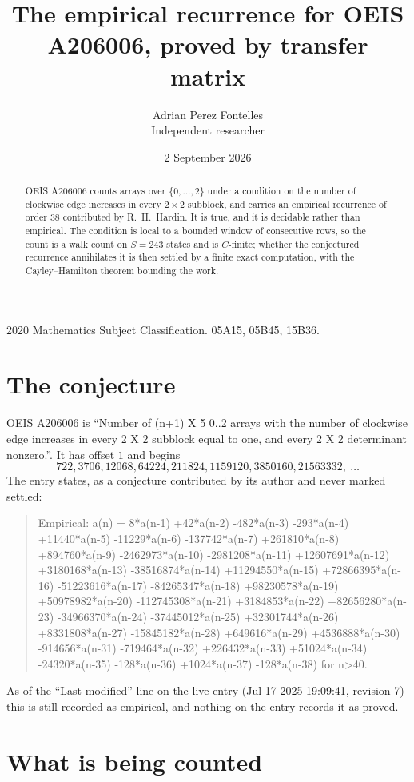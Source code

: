 \documentclass[11pt,a4paper]{article}
\title{The empirical recurrence for OEIS A206006, proved by transfer matrix}
\author{Adrian Perez Fontelles\\ \small Independent researcher}
\date{2 September 2026}
\theoremstyle{plain}
\theoremstyle{definition}
\begin{document}
\maketitle

\begin{abstract}
OEIS A206006 counts arrays over $\{0,\dots,2\}$ under a condition on the number of clockwise edge increases
in every $2\times2$ subblock, and carries an empirical recurrence of order $38$ contributed by
R.~H.~Hardin. It is true, and it is decidable rather than empirical. The condition is local to
a bounded window of consecutive rows, so the count is a walk count on $S=243$ states and is
$C$-finite; whether the conjectured recurrence annihilates it is then settled by a finite exact
computation, with the Cayley--Hamilton theorem bounding the work.
\end{abstract}

\noindent\small 2020 Mathematics Subject Classification. 05A15, 05B45, 15B36.\normalsize

\section{The conjecture}

OEIS A206006 is ``Number of (n+1) X 5 0..2 arrays with the number of clockwise edge increases in every 2 X 2 subblock equal to one, and every 2 X 2 determinant nonzero.''. It has offset $1$ and begins
\[
722, 3706, 12068, 64224, 211824, 1159120, 3850160, 21563332,\ \dots
\]
The entry states, as a conjecture contributed by its author and never marked settled:
\begin{quote}
Empirical: a(n) = 8*a(n-1) +42*a(n-2) -482*a(n-3) -293*a(n-4) +11440*a(n-5) -11229*a(n-6) -137742*a(n-7) +261810*a(n-8) +894760*a(n-9) -2462973*a(n-10) -2981208*a(n-11) +12607691*a(n-12) +3180168*a(n-13) -38516874*a(n-14) +11294550*a(n-15) +72866395*a(n-16) -51223616*a(n-17) -84265347*a(n-18) +98230578*a(n-19) +50978982*a(n-20) -112745308*a(n-21) +3184853*a(n-22) +82656280*a(n-23) -34966370*a(n-24) -37445012*a(n-25) +32301744*a(n-26) +8331808*a(n-27) -15845182*a(n-28) +649616*a(n-29) +4536888*a(n-30) -914656*a(n-31) -719464*a(n-32) +226432*a(n-33) +51024*a(n-34) -24320*a(n-35) -128*a(n-36) +1024*a(n-37) -128*a(n-38) for n>40.
\end{quote}
As of the ``Last modified'' line on the live entry (Jul 17 2025 19:09:41, revision 7) this is still
recorded as empirical, and nothing on the entry records it as proved.

\section{What is being counted}
\end{document}
